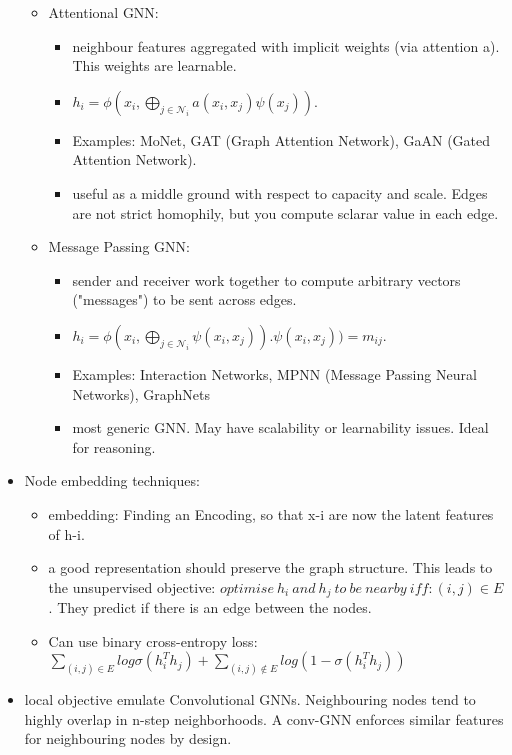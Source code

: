 \begin{itemize}[noitemsep,nolistsep]
\begin{itemize}[noitemsep,nolistsep]
		\item Attentional GNN:
		\begin{itemize}[noitemsep,nolistsep]
			\item neighbour features aggregated with implicit weights (via attention a). This weights are learnable.
			\item $h_i = \phi (x_i, \bigoplus_{j \in \mathcal{N}_i} a(x_i,x_j)\psi(x_j))$. 
			\item Examples: MoNet, GAT (Graph Attention Network), GaAN (Gated Attention Network).
			\item useful as a middle ground with respect to capacity and scale. Edges are not strict homophily, but you compute sclarar value in each edge.
		\end{itemize}
		\item Message Passing GNN:
		\begin{itemize}[noitemsep,nolistsep]
			\item sender and receiver work together to compute arbitrary vectors ("messages") to be sent across edges.
			\item $h_i = \phi (x_i, \bigoplus_{j \in \mathcal{N}_i} \psi(x_i, x_j)). \psi(x_i, x_j)) = m_{ij}$.  
			\item Examples: Interaction Networks, MPNN (Message Passing Neural Networks), GraphNets
			\item most generic GNN. May have scalability or learnability issues. Ideal for reasoning.
		\end{itemize}
	\end{itemize}
	\item Node embedding techniques:
	\begin{itemize}[noitemsep,nolistsep]
		\item embedding: Finding an Encoding, so that x-i are now the latent features of h-i.
		\item a good representation should preserve the graph structure. This leads to the unsupervised objective: $optimise\ h_i\ and\ h_j\ to\ be\ nearby\ iff: (i,j) \in E$. They predict if there is an edge between the nodes.
		\item Can use binary cross-entropy loss: $\sum_{(i,j) \in E}log \sigma(h_i^Th_j) + \sum_{(i,j) \notin E}log (1 - \sigma(h_i^Th_j))$
	\end{itemize}
	\item local objective emulate Convolutional GNNs. Neighbouring nodes tend to highly overlap in n-step neighborhoods. A conv-GNN enforces similar features for neighbouring nodes by design.

\end{itemize}

